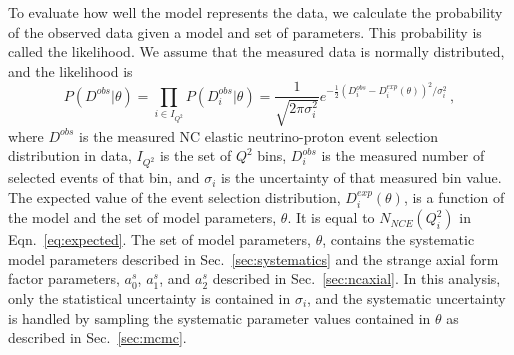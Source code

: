     To evaluate how well the model represents the data, we calculate the
    probability of the observed data given a model and set of parameters.  This
    probability is called the likelihood. We assume that the measured data is
    normally distributed, and the likelihood is
    \begin{equation}\label{eq:likelihood}
      P(D^{obs}|\theta) = \prod_{i\in I_{Q^2}} P(D^{obs}_i|\theta) = \frac{1}{\sqrt{2\pi \sigma_i^2}}
             e^{-\frac{1}{2}(D^{obs}_i - D^{exp}_i(\theta))^2/\sigma_i^2} \,,
    \end{equation}
    where $D^{obs}$ is the measured NC elastic neutrino-proton event selection
    distribution in data, $I_{Q^2}$ is the set of $Q^2$ bins, $D^{obs}_i$ is
    the measured number of selected events of that bin, and $\sigma_i$ is the
    uncertainty of that measured bin value. The expected value of the event
    selection distribution, $D^{exp}_i(\theta)$, is a function of the model and
    the set of model parameters, $\theta$. It is equal to $N_{NCE}(Q^2_i)$ in
    Eqn.~\ref{eq:expected}. The set of model parameters, $\theta$, contains the
    systematic model parameters described in Sec.~\ref{sec:systematics} and the
    strange axial form factor parameters, $a_0^s$, $a_1^s$, and $a_2^s$
    described in Sec.~\ref{sec:ncaxial}. In this analysis, only the statistical
    uncertainty is contained in $\sigma_i$, and the systematic uncertainty is
    handled by sampling the systematic parameter values contained in $\theta$
    as described in Sec.~\ref{sec:mcmc}. 

